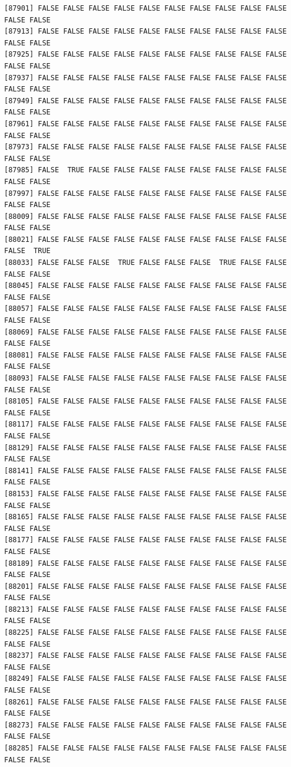 \documentclass[
  a4paper,
  DIV=11,
  numbers=noendperiod]{scrartcl}
\begin{document}
\begin{verbatim}
[87901] FALSE FALSE FALSE FALSE FALSE FALSE FALSE FALSE FALSE FALSE FALSE FALSE
[87913] FALSE FALSE FALSE FALSE FALSE FALSE FALSE FALSE FALSE FALSE FALSE FALSE
[87925] FALSE FALSE FALSE FALSE FALSE FALSE FALSE FALSE FALSE FALSE FALSE FALSE
[87937] FALSE FALSE FALSE FALSE FALSE FALSE FALSE FALSE FALSE FALSE FALSE FALSE
[87949] FALSE FALSE FALSE FALSE FALSE FALSE FALSE FALSE FALSE FALSE FALSE FALSE
[87961] FALSE FALSE FALSE FALSE FALSE FALSE FALSE FALSE FALSE FALSE FALSE FALSE
[87973] FALSE FALSE FALSE FALSE FALSE FALSE FALSE FALSE FALSE FALSE FALSE FALSE
[87985] FALSE  TRUE FALSE FALSE FALSE FALSE FALSE FALSE FALSE FALSE FALSE FALSE
[87997] FALSE FALSE FALSE FALSE FALSE FALSE FALSE FALSE FALSE FALSE FALSE FALSE
[88009] FALSE FALSE FALSE FALSE FALSE FALSE FALSE FALSE FALSE FALSE FALSE FALSE
[88021] FALSE FALSE FALSE FALSE FALSE FALSE FALSE FALSE FALSE FALSE FALSE  TRUE
[88033] FALSE FALSE FALSE  TRUE FALSE FALSE FALSE  TRUE FALSE FALSE FALSE FALSE
[88045] FALSE FALSE FALSE FALSE FALSE FALSE FALSE FALSE FALSE FALSE FALSE FALSE
[88057] FALSE FALSE FALSE FALSE FALSE FALSE FALSE FALSE FALSE FALSE FALSE FALSE
[88069] FALSE FALSE FALSE FALSE FALSE FALSE FALSE FALSE FALSE FALSE FALSE FALSE
[88081] FALSE FALSE FALSE FALSE FALSE FALSE FALSE FALSE FALSE FALSE FALSE FALSE
[88093] FALSE FALSE FALSE FALSE FALSE FALSE FALSE FALSE FALSE FALSE FALSE FALSE
[88105] FALSE FALSE FALSE FALSE FALSE FALSE FALSE FALSE FALSE FALSE FALSE FALSE
[88117] FALSE FALSE FALSE FALSE FALSE FALSE FALSE FALSE FALSE FALSE FALSE FALSE
[88129] FALSE FALSE FALSE FALSE FALSE FALSE FALSE FALSE FALSE FALSE FALSE FALSE
[88141] FALSE FALSE FALSE FALSE FALSE FALSE FALSE FALSE FALSE FALSE FALSE FALSE
[88153] FALSE FALSE FALSE FALSE FALSE FALSE FALSE FALSE FALSE FALSE FALSE FALSE
[88165] FALSE FALSE FALSE FALSE FALSE FALSE FALSE FALSE FALSE FALSE FALSE FALSE
[88177] FALSE FALSE FALSE FALSE FALSE FALSE FALSE FALSE FALSE FALSE FALSE FALSE
[88189] FALSE FALSE FALSE FALSE FALSE FALSE FALSE FALSE FALSE FALSE FALSE FALSE
[88201] FALSE FALSE FALSE FALSE FALSE FALSE FALSE FALSE FALSE FALSE FALSE FALSE
[88213] FALSE FALSE FALSE FALSE FALSE FALSE FALSE FALSE FALSE FALSE FALSE FALSE
[88225] FALSE FALSE FALSE FALSE FALSE FALSE FALSE FALSE FALSE FALSE FALSE FALSE
[88237] FALSE FALSE FALSE FALSE FALSE FALSE FALSE FALSE FALSE FALSE FALSE FALSE
[88249] FALSE FALSE FALSE FALSE FALSE FALSE FALSE FALSE FALSE FALSE FALSE FALSE
[88261] FALSE FALSE FALSE FALSE FALSE FALSE FALSE FALSE FALSE FALSE FALSE FALSE
[88273] FALSE FALSE FALSE FALSE FALSE FALSE FALSE FALSE FALSE FALSE FALSE FALSE
[88285] FALSE FALSE FALSE FALSE FALSE FALSE FALSE FALSE FALSE FALSE FALSE FALSE

\end{verbatim}
\end{document}
